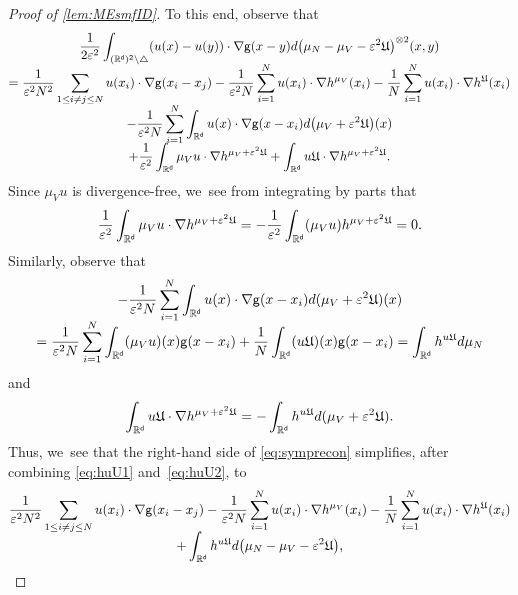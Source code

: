 \documentclass[JEP,XML,SOM,Unicode,published]{cedram}
\let\epsilon\varepsilon
\theoremstyle{plain}
\theoremstyle{definition}
\DeclarePairedDelimiter{\pa}{\lparen}{\rparen}
\let\div\relax
\DeclareMathOperator{\div}{\mathrm{div}}
\newcommand{\R}{{\mathbb{R}}}
\let\ep\epsilon
\let\vep\varepsilon
\newcommand{\Uu}{\mathfrak{U}}
\renewcommand{\d}{\mathsf{d}}
\newcommand{\g}{{\mathsf{g}}}
\begin{document}
\begin{proof}[Proof of \cref{lem:MEsmfID}]
To this end, observe that\vspace*{-8pt}
\begin{multline}\label{eq:symprecon}
\frac{1}{2\vep^2}\int_{(\R^\d)^2\setminus\triangle} \pa*{u(x)-u(y)}\cdot\nabla\g(x-y)d\pa*{\mu_N-\mu_V-\vep^2\Uu}^{\otimes 2}(x,y)\\[-5pt]
=\frac{1}{\vep^2 N^2}\sum_{1\leq i\neq j\leq N} u(x_i)\cdot\nabla\g(x_i-x_j) - \frac{1}{\vep^2 N}\sum_{i=1}^N u(x_i)\cdot\nabla h^{\mu_V}(x_i) - \frac{1}{N}\sum_{i=1}^N u(x_i)\cdot\nabla h^{\Uu}(x_i) \\[-5pt]
-\frac{1}{\vep^2 N}\sum_{i=1}^N\int_{\R^\d} u(x)\cdot\nabla\g(x-x_i)d\pa*{\mu_V+\ep^2\Uu}(x) \\[-5pt]
+ \frac{1}{\vep^2}\int_{\R^\d} \mu_V u\cdot\nabla h^{\mu_V+\vep^2\Uu} + \int_{\R^\d}u\Uu\cdot \nabla h^{\mu_V+\vep^2\Uu}.
\end{multline}
Since $\mu_V u$ is divergence-free, we~see from integrating by parts that\vspace*{-5pt}
\begin{align*}
\frac{1}{\vep^2}\int_{\R^\d} \mu_V u\cdot\nabla h^{\mu_V+\vep^2\Uu} =-\frac{1}{\vep^2}\int_{\R^\d}\div(\mu_V u) h^{\mu_V+\vep^2\Uu} =0.
\end{align*}
Similarly, observe that\vspace*{-8pt}
\begin{multline}
-\frac{1}{\vep^2N}\sum_{i=1}^N\int_{\R^\d}u(x)\cdot\nabla\g(x-x_i)d(\mu_V+\vep^2\Uu)(x)\\[-5pt]
= \frac{1}{\vep^2 N}\sum_{i=1}^N \int_{\R^\d}\div(\mu_V u)(x)\g(x-x_i) + \frac{1}{N} \int_{\R^\d}\div(u\Uu)(x) \g( x-x_i) =\int_{\R^\d}\div h^{u\Uu}d\mu_N \label{eq:huU1}
\end{multline}
and\vspace*{-5pt}
\begin{equation}\label{eq:huU2}
\int_{\R^\d}u\Uu\cdot \nabla h^{\mu_V+\vep^2\Uu} = -\int_{\R^\d}\div h^{u\Uu} d(\mu_V+\vep^2\Uu).
\end{equation}
Thus, we~see that the right-hand side of \eqref{eq:symprecon} simplifies, after combining \eqref{eq:huU1} and~\eqref{eq:huU2}, to\vspace*{-8pt}
\begin{multline*}
\frac{1}{\vep^2 N^2}\sum_{1\leq i\neq j\leq N} u(x_i)\cdot\nabla\g(x_i-x_j) - \frac{1}{\vep^2 N}\sum_{i=1}^N u(x_i)\cdot\nabla h^{\mu_V}(x_i)- \frac{1}{N}\sum_{i=1}^N u(x_i)\cdot\nabla h^{\Uu}(x_i) \\[-5pt]
+ \int_{\R^\d} \div h^{u\Uu}d\pa*{\mu_N-\mu_V-\vep^2\Uu},

\end{multline*}
\end{proof}
\end{document}
